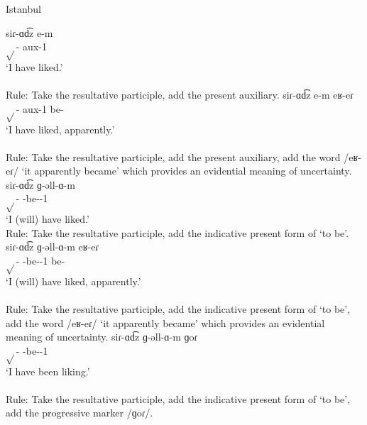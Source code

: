 \begin{exe}
	\ex Istanbul \label{sent:Istanbul:morpho:verb:complex:resultpart} 
	\begin{xlist}
		\ex \gll siɾ-ɑd͡z e-m \\
		$\sqrt{}$-{\rptcp} {aux}-1{\sg}\\
		\trans `I have liked.'\\
		 \\
		Rule: Take the resultative participle, add the present auxiliary.
		\ex \gll siɾ-ɑd͡z e-m eʁ-eɾ \\
		$\sqrt{}$-{\rptcp} {aux}-1{\sg} be-{\eptcp} \\
		\trans `I have liked, apparently.' \\
		 \\
		Rule: Take the resultative participle, add the present auxiliary, add the word /eʁ-eɾ/ `it apparently became' which provides an evidential meaning of uncertainty.
		\ex \gll siɾ-ɑd͡z ɡ-əll-ɑ-m \\
		$\sqrt{}$-{\rptcp} {\ind}-be-{\thgloss}-1{\sg} \\
		\trans `I (will) have liked.'
		 \\
		Rule: Take the resultative participle, add the indicative present form of `to be'.
		\ex \gll siɾ-ɑd͡z ɡ-əll-ɑ-m eʁ-eɾ \\
		$\sqrt{}$-{\rptcp} {\ind}-be-{\thgloss}-1{\sg} be-{\eptcp}\\
		\trans `I (will) have liked, apparently.' \\
		 \\
		Rule: Take the resultative participle, add the indicative present form of `to be', add the word /eʁ-eɾ/ `it apparently became' which provides an evidential meaning of uncertainty.
		\ex \gll siɾ-ɑd͡z ɡ-əll-ɑ-m ɡoɾ \\
		$\sqrt{}$-{\rptcp} {\ind}-be-{\thgloss}-1{\sg} {\prog} \\
		\trans `I have been liking.' \\
		 \\
		Rule: Take the resultative participle, add the indicative present form of `to be', add the progressive marker /ɡoɾ/. 
		

\end{xlist}
\end{exe}
